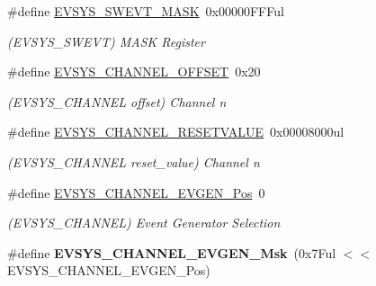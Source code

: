 \begin{DoxyCompactItemize}
\item 
\hypertarget{group___s_a_m_l21___e_v_s_y_s_ga6d1354f5762fb3cbc2a99f5ca0cb29bf}{}\#define \hyperlink{group___s_a_m_l21___e_v_s_y_s_ga6d1354f5762fb3cbc2a99f5ca0cb29bf}{E\+V\+S\+Y\+S\+\_\+\+S\+W\+E\+V\+T\+\_\+\+M\+A\+S\+K}~0x00000\+F\+F\+Ful\label{group___s_a_m_l21___e_v_s_y_s_ga6d1354f5762fb3cbc2a99f5ca0cb29bf}

\begin{DoxyCompactList}\small\item\em (E\+V\+S\+Y\+S\+\_\+\+S\+W\+E\+V\+T) M\+A\+S\+K Register \end{DoxyCompactList}\item 
\hypertarget{group___s_a_m_l21___e_v_s_y_s_ga1c32a9bc329d630176a5c3ee341041d9}{}\#define \hyperlink{group___s_a_m_l21___e_v_s_y_s_ga1c32a9bc329d630176a5c3ee341041d9}{E\+V\+S\+Y\+S\+\_\+\+C\+H\+A\+N\+N\+E\+L\+\_\+\+O\+F\+F\+S\+E\+T}~0x20\label{group___s_a_m_l21___e_v_s_y_s_ga1c32a9bc329d630176a5c3ee341041d9}

\begin{DoxyCompactList}\small\item\em (E\+V\+S\+Y\+S\+\_\+\+C\+H\+A\+N\+N\+E\+L offset) Channel n \end{DoxyCompactList}\item 
\hypertarget{group___s_a_m_l21___e_v_s_y_s_gaae954ef91a3c4d06efe030fec2c37dda}{}\#define \hyperlink{group___s_a_m_l21___e_v_s_y_s_gaae954ef91a3c4d06efe030fec2c37dda}{E\+V\+S\+Y\+S\+\_\+\+C\+H\+A\+N\+N\+E\+L\+\_\+\+R\+E\+S\+E\+T\+V\+A\+L\+U\+E}~0x00008000ul\label{group___s_a_m_l21___e_v_s_y_s_gaae954ef91a3c4d06efe030fec2c37dda}

\begin{DoxyCompactList}\small\item\em (E\+V\+S\+Y\+S\+\_\+\+C\+H\+A\+N\+N\+E\+L reset\+\_\+value) Channel n \end{DoxyCompactList}\item 
\hypertarget{group___s_a_m_l21___e_v_s_y_s_ga49da646ddac2acf9b067c8299b5f6335}{}\#define \hyperlink{group___s_a_m_l21___e_v_s_y_s_ga49da646ddac2acf9b067c8299b5f6335}{E\+V\+S\+Y\+S\+\_\+\+C\+H\+A\+N\+N\+E\+L\+\_\+\+E\+V\+G\+E\+N\+\_\+\+Pos}~0\label{group___s_a_m_l21___e_v_s_y_s_ga49da646ddac2acf9b067c8299b5f6335}

\begin{DoxyCompactList}\small\item\em (E\+V\+S\+Y\+S\+\_\+\+C\+H\+A\+N\+N\+E\+L) Event Generator Selection \end{DoxyCompactList}\item 
\hypertarget{group___s_a_m_l21___e_v_s_y_s_gafb9b70ff5a602f5a8ac9a5e2ee5ffe19}{}\#define {\bfseries E\+V\+S\+Y\+S\+\_\+\+C\+H\+A\+N\+N\+E\+L\+\_\+\+E\+V\+G\+E\+N\+\_\+\+Msk}~(0x7\+Ful $<$$<$ E\+V\+S\+Y\+S\+\_\+\+C\+H\+A\+N\+N\+E\+L\+\_\+\+E\+V\+G\+E\+N\+\_\+\+Pos)\label{group___s_a_m_l21___e_v_s_y_s_gafb9b70ff5a602f5a8ac9a5e2ee5ffe19}


\end{DoxyCompactItemize}

